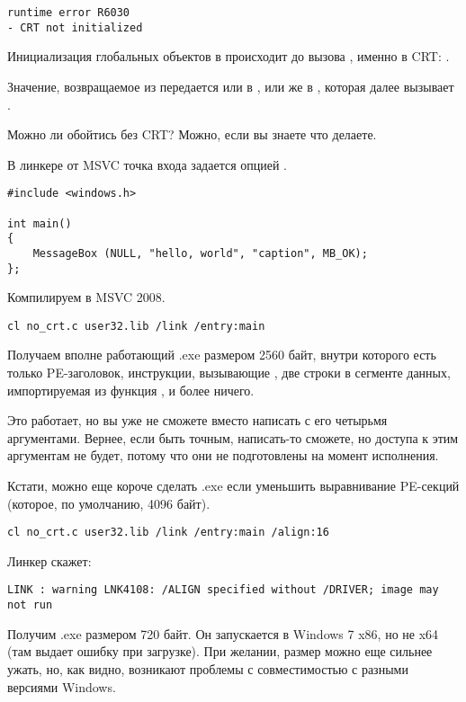 \begin{lstlisting}
runtime error R6030
- CRT not initialized
\end{lstlisting}

Инициализация глобальных объектов в \Cpp происходит до вызова \main{}, именно в \ac{CRT}: 
.

Значение, возвращаемое из \main{} передается или в , 
или же в , которая далее вызывает .

Можно ли обойтись без \ac{CRT}? Можно, если вы знаете что делаете.

В линкере от \ac{MSVC} точка входа задается опцией .

\begin{lstlisting}
#include <windows.h>

int main()
{
	MessageBox (NULL, "hello, world", "caption", MB_OK);
};
\end{lstlisting}

Компилируем в MSVC 2008.

\begin{lstlisting}
cl no_crt.c user32.lib /link /entry:main
\end{lstlisting}

Получаем вполне работающий .exe размером 2560 байт, внутри которого есть только PE-заголовок, инструкции, 
вызывающие ,
две строки в сегменте данных, импортируемая из  функция , и более ничего.

Это работает, но вы уже не сможете вместо \main{} написать  с его четырьмя аргументами.
Вернее, если быть точным, написать-то сможете, но доступа к этим аргументам не будет, 
потому что они не подготовлены на момент исполнения.

Кстати, можно еще короче сделать .exe если уменьшить 
выравнивание \ac{PE}-секций (которое, по умолчанию, 4096 байт).

\begin{lstlisting}
cl no_crt.c user32.lib /link /entry:main /align:16
\end{lstlisting}

Линкер скажет:

\begin{lstlisting}
LINK : warning LNK4108: /ALIGN specified without /DRIVER; image may not run
\end{lstlisting}

Получим .exe размером 720 байт.
Он запускается в Windows 7 x86, но не x64 
(там выдает ошибку при загрузке).
При желании, размер можно еще сильнее ужать, но, как видно, 
возникают проблемы с совместимостью с разными версиями Windows.

